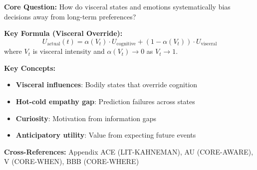 \begin{tcolorbox}[colback=blue!5!white, colframe=blue!75!black,
    title=Quick Reference: LIT-LOEWENSTEIN]

\textbf{Core Question:} How do visceral states and emotions systematically bias decisions away from long-term preferences?

\textbf{Key Formula (Visceral Override):}
\begin{equation}
U_{\text{actual}}(t) = \alpha(V_t) \cdot U_{\text{cognitive}} + (1-\alpha(V_t)) \cdot U_{\text{visceral}}
\end{equation}
where $V_t$ is visceral intensity and $\alpha(V_t) \to 0$ as $V_t \to 1$.

\textbf{Key Concepts:}
\begin{itemize}[nosep]
\item \textbf{Visceral influences}: Bodily states that override cognition
\item \textbf{Hot-cold empathy gap}: Prediction failures across states
\item \textbf{Curiosity}: Motivation from information gaps
\item \textbf{Anticipatory utility}: Value from expecting future events
\end{itemize}

\textbf{Cross-References:} Appendix ACE (LIT-KAHNEMAN), AU (CORE-AWARE), V (CORE-WHEN), BBB (CORE-WHERE)
\end{tcolorbox}


